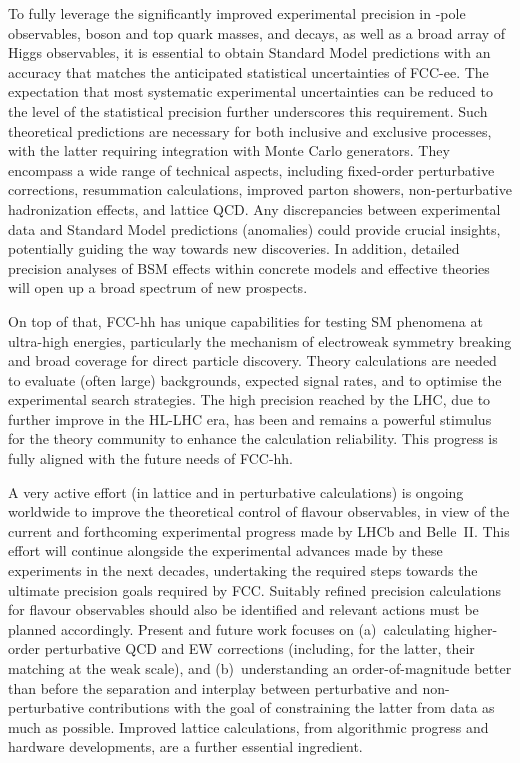 To fully leverage the significantly improved experimental precision in \PZ-pole observables, \PW boson and top quark masses, \PQb and \PGt decays, 
as well as a broad array of Higgs observables, 
it is essential to obtain Standard Model predictions with an accuracy that matches the anticipated statistical uncertainties of FCC-ee. 
The expectation that most systematic experimental uncertainties can be reduced to the level of the statistical precision further underscores this requirement.
Such theoretical predictions are necessary for both inclusive and exclusive processes, 
with the latter requiring integration with Monte Carlo generators. 
They encompass a wide range of technical aspects, including fixed-order perturbative corrections, resummation calculations, 
improved parton showers, non-perturbative hadronization effects, and lattice QCD. 
Any discrepancies between experimental data and Standard Model predictions (anomalies) could provide crucial insights, potentially guiding the way towards new discoveries.
In addition, detailed precision analyses of BSM effects within concrete models and effective theories will open up a broad spectrum of new prospects.

On top of that, FCC-hh has unique capabilities for testing SM phenomena at ultra-high energies, 
particularly the mechanism of electroweak symmetry breaking and broad coverage for direct particle discovery. 
Theory calculations are needed to evaluate (often large) backgrounds, expected signal rates, and to optimise the experimental search strategies. 
The high precision reached by the LHC, due to further improve in the HL-LHC era, 
has been and remains a powerful stimulus for the theory community to enhance the calculation reliability. 
This progress is fully aligned with the future needs of FCC-hh.

A very active effort (in lattice and in perturbative calculations) is ongoing worldwide to improve the theoretical control of flavour observables, 
in view of the current and forthcoming experimental progress made by LHCb and Belle~II. 
This effort will continue alongside the experimental advances made by these experiments in the next decades, 
undertaking the required steps towards the ultimate precision goals required by FCC. 
Suitably refined precision calculations for flavour observables should also be identified and relevant actions must be planned accordingly. 
Present and future work focuses on 
(a)~calculating higher-order perturbative QCD and EW corrections (including, for the latter, their matching at the weak scale), 
and (b)~understanding an order-of-magnitude better than before the separation and interplay between 
perturbative and non-perturbative contributions with the goal of constraining the latter from data as much as possible.
Improved lattice calculations, from algorithmic progress and hardware developments, are a further essential ingredient. 

